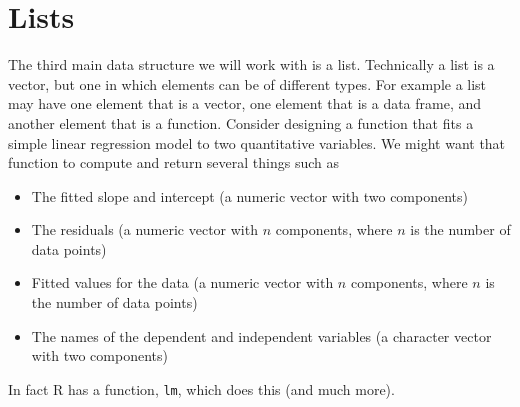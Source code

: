 \documentclass[12pt,oneside]{book}\usepackage[]{graphicx}\usepackage[]{color}
\begin{document}
\section{Lists}
The third main data structure we will work with is a list. Technically a list is a vector, but one in which elements can be of different types. For example a list may have one element that is a vector, one element that is a data frame, and another element that is a function. Consider designing a function that fits a simple linear regression model to two quantitative variables. We might want that function to compute and return several things such as
\begin{itemize}
\item The fitted slope and intercept (a numeric vector with two components)
\item The residuals (a numeric vector with $n$ components, where $n$ is the number of data points)
\item Fitted values for the data (a numeric vector with $n$ components, where $n$ is the number of data points)
\item The names of the dependent and independent variables (a character vector with two components)
\end{itemize}
In fact R has a function, \verb+lm+, which does this (and much more). 
\end{document}
